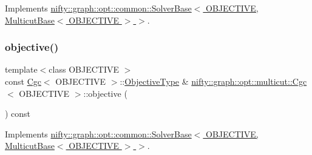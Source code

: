 Implements \hyperlink{classnifty_1_1graph_1_1opt_1_1common_1_1SolverBase_af638b9a804cfec3e35fe87c77e942d30}{nifty\+::graph\+::opt\+::common\+::\+Solver\+Base$<$ O\+B\+J\+E\+C\+T\+I\+V\+E, Multicut\+Base$<$ O\+B\+J\+E\+C\+T\+I\+V\+E $>$ $>$}.

\mbox{\label{classnifty_1_1graph_1_1opt_1_1multicut_1_1Cgc_a3516566160ba18067f1a81dfa6aee33e}} 
\subsubsection{\texorpdfstring{objective()}{objective()}}
{\footnotesize\ttfamily template$<$class O\+B\+J\+E\+C\+T\+I\+VE $>$ \\
const \hyperlink{classnifty_1_1graph_1_1opt_1_1multicut_1_1Cgc}{Cgc}$<$ O\+B\+J\+E\+C\+T\+I\+VE $>$\+::\hyperlink{classnifty_1_1graph_1_1opt_1_1multicut_1_1Cgc_aa83ae7cd167c0580c61f1d4eab63eb9a}{Objective\+Type} \& \hyperlink{classnifty_1_1graph_1_1opt_1_1multicut_1_1Cgc}{nifty\+::graph\+::opt\+::multicut\+::\+Cgc}$<$ O\+B\+J\+E\+C\+T\+I\+VE $>$\+::objective (\begin{DoxyParamCaption}{ }\end{DoxyParamCaption}) const\hspace{0.3cm}{\ttfamily [virtual]}}



Implements \hyperlink{classnifty_1_1graph_1_1opt_1_1common_1_1SolverBase_a55e9eb645c07d6e0782ebfb990ab3c84}{nifty\+::graph\+::opt\+::common\+::\+Solver\+Base$<$ O\+B\+J\+E\+C\+T\+I\+V\+E, Multicut\+Base$<$ O\+B\+J\+E\+C\+T\+I\+V\+E $>$ $>$}.

\mbox{\label{classnifty_1_1graph_1_1opt_1_1multicut_1_1Cgc_a56de905a25ea793359e267360238d0e4}} 
